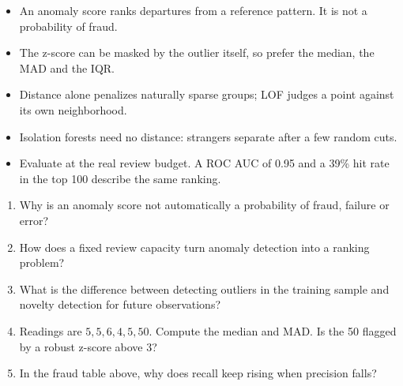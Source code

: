 \begin{chapterrecap}
\begin{itemize}
  \item An anomaly score ranks departures from a reference pattern. It is not a probability of fraud.
  \item The z-score can be masked by the outlier itself, so prefer the median, the MAD and the IQR.
  \item Distance alone penalizes naturally sparse groups; LOF judges a point against its own neighborhood.
  \item Isolation forests need no distance: strangers separate after a few random cuts.
  \item Evaluate at the real review budget. A ROC AUC of 0.95 and a 39\% hit rate in the top 100 describe the same ranking.
\end{itemize}
\end{chapterrecap}

\begin{quickcheck}
\begin{enumerate}
  \item Why is an anomaly score not automatically a probability of fraud, failure or error?
  \item How does a fixed review capacity turn anomaly detection into a ranking problem?
  \item What is the difference between detecting outliers in the training sample and novelty detection for future observations?
  \item Readings are $5,5,6,4,5,50$. Compute the median and MAD. Is the 50 flagged by a robust z-score above 3?
  \item In the fraud table above, why does recall keep rising when precision falls?
\end{enumerate}
\end{quickcheck}
